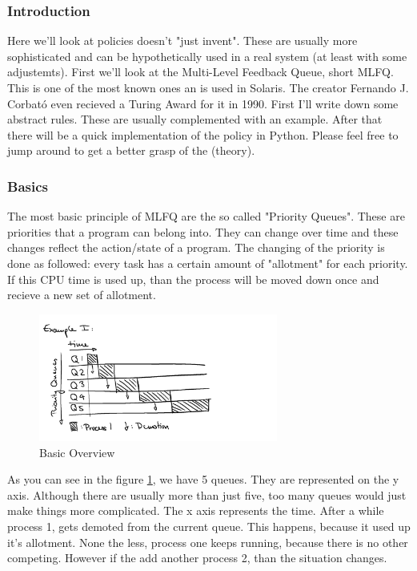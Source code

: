 \documentclass{report}
\begin{document}
\subsubsection{Introduction}
Here we'll look at policies doesn't "just invent".
These are usually more sophisticated and can be hypothetically used in a real system (at least with some adjustemts). 
First we'll look at the Multi-Level Feedback Queue, short MLFQ. 
This is one of the most known ones an is used in Solaris.
The creator Fernando J. Corbató even recieved a Turing Award for it in 1990.
First I'll write down some abstract rules. These are usually complemented with an example. 
After that there will be a quick implementation of the policy in Python.
Please feel free to jump around to get a better grasp of the (theory).

\subsubsection{Basics}

The most basic principle of MLFQ are the so called "Priority Queues". These are priorities that a program can belong into.
They can change over time and these changes reflect the action/state of a program.
The changing of the priority is done as followed: every task has a certain amount of "allotment" for each priority.
If this CPU time is used up, than the process will be moved down once and recieve a new set of allotment.

\begin{figure}[h]
  \begin{center}
    \includegraphics[width=0.7\textwidth]{assets/mlfq-diag-1.png}
    \caption{Basic Overview}
    \label{mlfq-diag-1}
  \end{center}
\end{figure}

As you can see in the figure \ref{mlfq-diag-1}, we have 5 queues. They are represented on the y axis. 
Although there are usually more than just five, too many queues would just make things more complicated. 
The x axis represents the time.
After a while process 1, gets demoted from the current queue. This happens, because it used up it's allotment.
None the less, process one keeps running, because there is no other competing. 
However if the add another process 2, than the situation changes.
\end{document}

